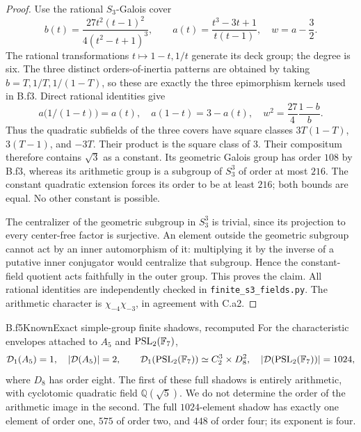 \begin{proof}
Use the rational $S_3$-Galois cover
\[
 b(t)=\frac{27t^2(t-1)^2}{4(t^2-t+1)^3},\qquad
 a(t)=\frac{t^3-3t+1}{t(t-1)},\quad w=a-\frac32.
\]
The rational transformations $t\mapsto1-t,1/t$ generate its deck group;
the degree is six. The three distinct orders-of-inertia patterns are
obtained by taking $b=T,1/T,1/(1-T)$, so these are exactly the three
epimorphism kernels used in B.f3. Direct rational identities give
\[
 a\bigl(1/(1-t)\bigr)=a(t),\quad a(1-t)=3-a(t),\quad
 w^2=\frac{27}{4}\frac{1-b}{b}.
\]
Thus the quadratic subfields of the three covers have square classes
$3T(1-T)$, $3(T-1)$, and $-3T$. Their product is the square class of $3$.
Their compositum therefore contains $\sqrt3$ as a constant.
Its geometric Galois group has order $108$ by B.f3, whereas its
arithmetic group is a subgroup of $S_3^3$ of order at most $216$.
The constant quadratic extension forces its order to be at least $216$;
both bounds are equal. No other constant is possible.

The centralizer of the geometric subgroup in $S_3^3$ is trivial,
since its projection to every center-free factor is surjective.
An element outside the geometric subgroup cannot act by an inner
automorphism of it: multiplying it by the inverse of a putative inner
conjugator would centralize that subgroup. Hence the constant-field
quotient acts faithfully in the outer group. This proves the claim.
All rational identities are independently checked in
\texttt{finite\_s3\_fields.py}. The arithmetic character is
$\chi_{-4}\chi_{-3}$, in agreement with C.a2.
\end{proof}

\begin{claim}{B.f5}{Known}{Exact simple-group finite shadows, recomputed}
For the characteristic envelopes attached to $A_5$ and $\operatorname{PSL}_2(\mathbb F_7)$,
\[
 \mathcal D_1(A_5)=1,\quad |\mathcal D(A_5)|=2,
 \qquad
 \mathcal D_1(\operatorname{PSL}_2(\mathbb F_7))\simeq C_2^3\times D_8^2,
 \quad |\mathcal D(\operatorname{PSL}_2(\mathbb F_7))|=1024,
\]
where $D_8$ has order eight. The first of these full shadows is entirely
arithmetic, with cyclotomic quadratic field $\mathbb Q(\sqrt5)$.
We do not determine the order of the arithmetic image in the second.
The full $1024$-element shadow has exactly one element of order one,
$575$ of order two, and $448$ of order four; its exponent is four.
\end{claim}

